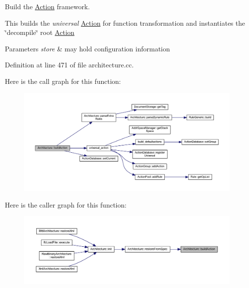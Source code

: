 Build the \mbox{\hyperlink{class_action}{Action}} framework. 

This builds the {\itshape universal} \mbox{\hyperlink{class_action}{Action}} for function transformation and instantiates the \char`\"{}decompile\char`\"{} root \mbox{\hyperlink{class_action}{Action}} 
\begin{DoxyParams}{Parameters}
{\em store} & may hold configuration information \\
\hline
\end{DoxyParams}


Definition at line 471 of file architecture.\+cc.

Here is the call graph for this function\+:
\nopagebreak
\begin{figure}[H]
\begin{center}
\leavevmode
\includegraphics[width=350pt]{class_architecture_ad646d95818d9c3615da8a259732546b8_cgraph}
\end{center}
\end{figure}
Here is the caller graph for this function\+:
\nopagebreak
\begin{figure}[H]
\begin{center}
\leavevmode
\includegraphics[width=350pt]{class_architecture_ad646d95818d9c3615da8a259732546b8_icgraph}
\end{center}
\end{figure}
\mbox{\label{class_architecture_a517bf0e0ba766b241edf122422766249}} 
